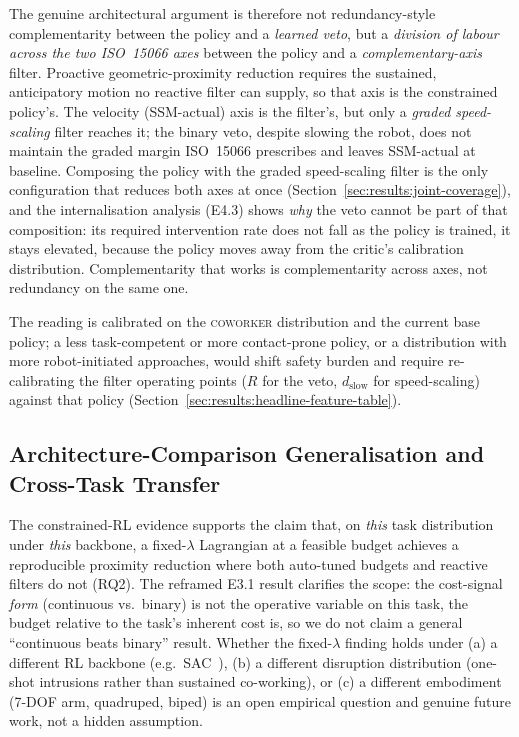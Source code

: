 \documentclass[11pt,a4paper]{report}
\newcommand{\ssm}{SSM}
\newcommand{\iso}{ISO~15066}
\newcommand{\coworker}{\textsc{coworker}}
\begin{document}
The genuine architectural argument is therefore not redundancy-style
complementarity between the policy and a \emph{learned veto}, but a
\emph{division of labour across the two \iso{} axes} between the policy
and a \emph{complementary-axis} filter. Proactive geometric-proximity
reduction requires the sustained, anticipatory motion no reactive
filter can supply, so that axis is the constrained policy's. The
velocity (\ssm{}-actual) axis is the filter's, but only a \emph{graded
speed-scaling} filter reaches it; the binary veto, despite slowing the
robot, does not maintain the graded margin \iso{} prescribes and
leaves \ssm{}-actual at baseline. Composing the policy with the graded
speed-scaling filter is the only configuration that reduces both axes
at once (Section~\ref{sec:results:joint-coverage}), and the
internalisation analysis (E4.3) shows \emph{why} the veto cannot be
part of that composition: its required intervention rate does not fall
as the policy is trained, it stays elevated, because the policy moves
away from the critic's calibration distribution. Complementarity that
works is complementarity across axes, not redundancy on the same one.

The reading is calibrated on the \coworker{} distribution and the
current base policy; a less task-competent or more contact-prone
policy, or a distribution with more robot-initiated approaches, would
shift safety burden and require re-calibrating the filter operating
points ($R$ for the veto, $d_{\mathrm{slow}}$ for speed-scaling)
against that policy
(Section~\ref{sec:results:headline-feature-table}).

\subsection{Architecture-Comparison Generalisation and Cross-Task Transfer}
\label{sec:disc:arch-gen}

The constrained-RL evidence supports the claim that, on \emph{this}
task distribution under \emph{this} backbone, a fixed-$\lambda$
Lagrangian at a feasible budget achieves a reproducible proximity
reduction where both auto-tuned budgets and reactive filters do not
(RQ2). The reframed E3.1 result clarifies the scope: the cost-signal
\emph{form} (continuous vs.\ binary) is not the operative variable on
this task, the budget relative to the task's inherent cost is, so we do
not claim a general ``continuous beats binary'' result. Whether the
fixed-$\lambda$ finding holds under (a) a different RL backbone
(e.g.\ SAC~\cite{yang2021wcsac}), (b) a different disruption
distribution (one-shot intrusions rather than sustained co-working),
or (c) a different embodiment (7-DOF arm, quadruped, biped) is an open
empirical question and genuine future work, not a hidden assumption.
\end{document}
